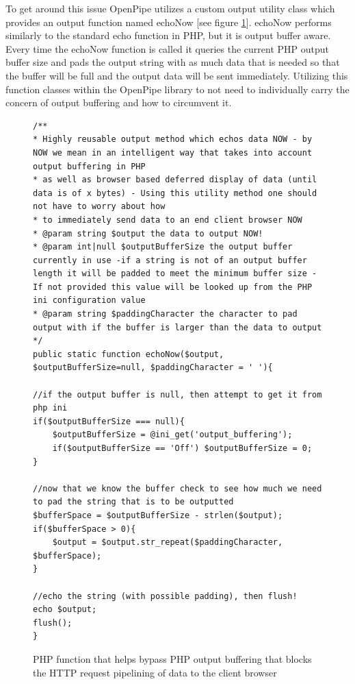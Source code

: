 \documentclass[12pt]{report}
\begin{document}
To get around this issue OpenPipe utilizes a custom output utility class which provides an output function named echoNow [see figure \ref{fig:echoNowCode}]. echoNow performs similarly to the standard echo function in PHP, but it is output buffer aware. Every time the echoNow function is called it queries the current PHP output buffer size and pads the output string with as much data that is needed so that the buffer will be full and the output data will be sent immediately. Utilizing this function classes within the OpenPipe library to not need to individually carry the concern of output buffering and how to circumvent it.

\begin{figure}[H]
\label{fig:echoNowCode}
\begin{lstlisting}
/**
* Highly reusable output method which echos data NOW - by NOW we mean in an intelligent way that takes into account output buffering in PHP
* as well as browser based deferred display of data (until data is of x bytes) - Using this utility method one should not have to worry about how 
* to immediately send data to an end client browser NOW
* @param string $output the data to output NOW!
* @param int|null $outputBufferSize the output buffer currently in use -if a string is not of an output buffer length it will be padded to meet the minimum buffer size - If not provided this value will be looked up from the PHP ini configuration value 
* @param string $paddingCharacter the character to pad output with if the buffer is larger than the data to output
*/
public static function echoNow($output, $outputBufferSize=null, $paddingCharacter = ' '){

//if the output buffer is null, then attempt to get it from php ini
if($outputBufferSize === null){
	$outputBufferSize = @ini_get('output_buffering');
	if($outputBufferSize == 'Off') $outputBufferSize = 0;
}
		
//now that we know the buffer check to see how much we need to pad the string that is to be outputted
$bufferSpace = $outputBufferSize - strlen($output);
if($bufferSpace > 0){
	$output = $output.str_repeat($paddingCharacter, $bufferSpace);
}

//echo the string (with possible padding), then flush!
echo $output;
flush();
}
\end{lstlisting}
\caption{PHP function that helps bypass PHP output buffering that blocks the HTTP request pipelining of data to the client browser}
\end{figure}
\end{document}

